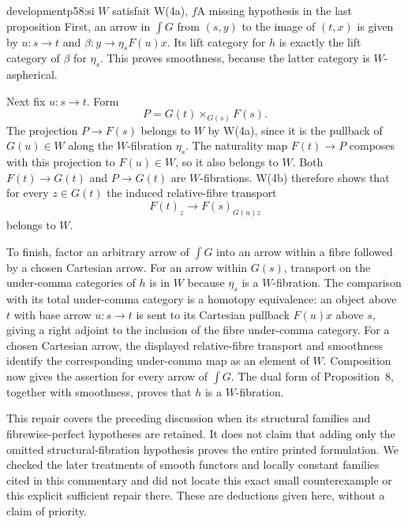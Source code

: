 \begin{dcomment}{development}{p58:si $W$ satisfait W(4a), $f$}{A missing hypothesis in the last proposition}
First, an arrow in $\int G$ from $(s,y)$ to the image of $(t,x)$ is given by $u:s\to t$ and $\beta:y\to\eta_sF(u)x$. Its lift category for $h$ is exactly the lift category of $\beta$ for $\eta_s$. This proves smoothness, because the latter category is $W$-aspherical.

Next fix $u:s\to t$. Form
\[
 P=G(t)\times_{G(s)}F(s).
\]
The projection $P\to F(s)$ belongs to $W$ by W(4a), since it is the pullback of $G(u)\in W$ along the $W$-fibration $\eta_s$. The naturality map $F(t)\to P$ composes with this projection to $F(u)\in W$, so it also belongs to $W$. Both $F(t)\to G(t)$ and $P\to G(t)$ are $W$-fibrations. W(4b) therefore shows that for every $z\in G(t)$ the induced relative-fibre transport
\[
 F(t)_z\longrightarrow F(s)_{G(u)z}
\]
belongs to $W$.

To finish, factor an arbitrary arrow of $\int G$ into an arrow within a fibre followed by a chosen Cartesian arrow. For an arrow within $G(s)$, transport on the under-comma categories of $h$ is in $W$ because $\eta_s$ is a $W$-fibration. The comparison with its total under-comma category is a homotopy equivalence: an object above $t$ with base arrow $u:s\to t$ is sent to its Cartesian pullback $F(u)x$ above $s$, giving a right adjoint to the inclusion of the fibre under-comma category. For a chosen Cartesian arrow, the displayed relative-fibre transport and smoothness identify the corresponding under-comma map as an element of $W$. Composition now gives the assertion for every arrow of $\int G$. The dual form of Proposition~8, together with smoothness, proves that $h$ is a $W$-fibration.

This repair covers the preceding discussion when its structural families and fibrewise-perfect hypotheses are retained. It does not claim that adding only the omitted structural-fibration hypothesis proves the entire printed formulation. We checked the later treatments of smooth functors and locally constant families cited in this commentary and did not locate this exact small counterexample or this explicit sufficient repair there. These are deductions given here, without a claim of priority.
\end{dcomment}

